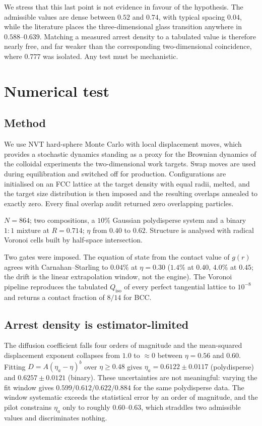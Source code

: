 \documentclass[aps,prl,twocolumn,superscriptaddress,floatfix]{revtex4-2}
\begin{document}
We stress that this last point is not evidence in favour of the hypothesis. The
admissible values are dense between $0.52$ and $0.74$, with typical spacing
$0.04$, while the literature places the three-dimensional glass transition
anywhere in $0.588$--$0.639$. Matching a measured arrest density to a tabulated
value is therefore nearly free, and far weaker than the corresponding
two-dimensional coincidence, where $0.777$ was isolated. Any test must be
mechanistic.

\section{Numerical test}

\subsection{Method}

We use NVT hard-sphere Monte Carlo with local displacement moves, which provides
a stochastic dynamics standing as a proxy for the Brownian dynamics of the
colloidal experiments the two-dimensional work targets. Swap moves are used
during equilibration and switched off for production. Configurations are
initialised on an FCC lattice at the target density with equal radii, melted, and
the target size distribution is then imposed and the resulting overlaps annealed
to exactly zero. Every final overlap audit returned zero overlapping particles.

$N=864$; two compositions, a $10\%$ Gaussian polydisperse system and a binary
$1{:}1$ mixture at $R=0.714$; $\eta$ from $0.40$ to $0.62$. Structure is analysed
with radical Voronoi cells built by half-space intersection.

Two gates were imposed. The equation of state from the contact value of $g(r)$
agrees with Carnahan--Starling to $0.04\%$ at $\eta=0.30$ ($1.4\%$ at $0.40$,
$4.0\%$ at $0.45$; the drift is the linear extrapolation window, not the engine).
The Voronoi pipeline reproduces the tabulated $Q_{\mathrm{iso}}$ of every perfect
tangential lattice to $10^{-8}$ and returns a contact fraction of $8/14$ for BCC.

\subsection{Arrest density is estimator-limited}

The diffusion coefficient falls four orders of magnitude and the mean-squared
displacement exponent collapses from $1.0$ to $\approx0$ between $\eta=0.56$ and
$0.60$. Fitting $D = A(\eta_a-\eta)^b$ over $\eta\geq0.48$ gives
$\eta_a=0.6122\pm0.0117$ (polydisperse) and $0.6257\pm0.0121$ (binary). These
uncertainties are not meaningful: varying the fit window gives
$0.599/0.612/0.622/0.884$ for the same polydisperse data. The window systematic
exceeds the statistical error by an order of magnitude, and the pilot constrains
$\eta_a$ only to roughly $0.60$--$0.63$, which straddles two admissible values
and discriminates nothing.
\end{document}
